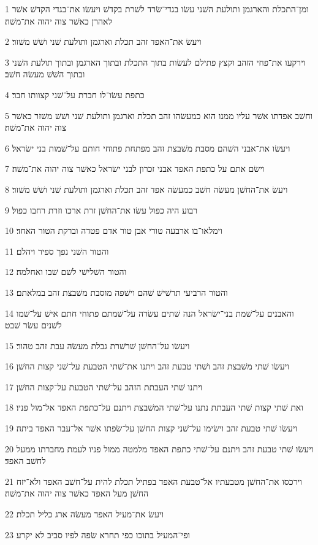 \par 1 ומן־התכלת והארגמן ותולעת השׁני עשׂו בגדי־שׂרד לשׁרת בקדשׁ ויעשׂו את־בגדי הקדשׁ אשׁר לאהרן כאשׁר צוה יהוה את־משׁה׃
\par 2 ויעשׂ את־האפד זהב תכלת וארגמן ותולעת שׁני ושׁשׁ משׁזר׃
\par 3 וירקעו את־פחי הזהב וקצץ פתילם לעשׂות בתוך התכלת ובתוך הארגמן ובתוך תולעת השׁני ובתוך השׁשׁ מעשׂה חשׁב׃
\par 4 כתפת עשׂו־לו חברת על־שׁני קצוותו חבר׃
\par 5 וחשׁב אפדתו אשׁר עליו ממנו הוא כמעשׂהו זהב תכלת וארגמן ותולעת שׁני ושׁשׁ משׁזר כאשׁר צוה יהוה את־משׁה׃
\par 6 ויעשׂו את־אבני השׁהם מסבת משׁבצת זהב מפתחת פתוחי חותם על־שׁמות בני ישׂראל׃
\par 7 וישׂם אתם על כתפת האפד אבני זכרון לבני ישׂראל כאשׁר צוה יהוה את־משׁה׃
\par 8 ויעשׂ את־החשׁן מעשׂה חשׁב כמעשׂה אפד זהב תכלת וארגמן ותולעת שׁני ושׁשׁ משׁזר׃
\par 9 רבוע היה כפול עשׂו את־החשׁן זרת ארכו וזרת רחבו כפול׃
\par 10 וימלאו־בו ארבעה טורי אבן טור אדם פטדה וברקת הטור האחד׃
\par 11 והטור השׁני נפך ספיר ויהלם׃
\par 12 והטור השׁלישׁי לשׁם שׁבו ואחלמה׃
\par 13 והטור הרביעי תרשׁישׁ שׁהם וישׁפה מוסבת משׁבצת זהב במלאתם׃
\par 14 והאבנים על־שׁמת בני־ישׂראל הנה שׁתים עשׂרה על־שׁמתם פתוחי חתם אישׁ על־שׁמו לשׁנים עשׂר שׁבט׃
\par 15 ויעשׂו על־החשׁן שׁרשׁרת גבלת מעשׂה עבת זהב טהור׃
\par 16 ויעשׂו שׁתי משׁבצת זהב ושׁתי טבעת זהב ויתנו את־שׁתי הטבעת על־שׁני קצות החשׁן׃
\par 17 ויתנו שׁתי העבתת הזהב על־שׁתי הטבעת על־קצות החשׁן׃
\par 18 ואת שׁתי קצות שׁתי העבתת נתנו על־שׁתי המשׁבצת ויתנם על־כתפת האפד אל־מול פניו׃
\par 19 ויעשׂו שׁתי טבעת זהב וישׂימו על־שׁני קצות החשׁן על־שׂפתו אשׁר אל־עבר האפד ביתה׃
\par 20 ויעשׂו שׁתי טבעת זהב ויתנם על־שׁתי כתפת האפד מלמטה ממול פניו לעמת מחברתו ממעל לחשׁב האפד׃
\par 21 וירכסו את־החשׁן מטבעתיו אל־טבעת האפד בפתיל תכלת להית על־חשׁב האפד ולא־יזח החשׁן מעל האפד כאשׁר צוה יהוה את־משׁה׃
\par 22 ויעשׂ את־מעיל האפד מעשׂה ארג כליל תכלת׃
\par 23 ופי־המעיל בתוכו כפי תחרא שׂפה לפיו סביב לא יקרע׃
